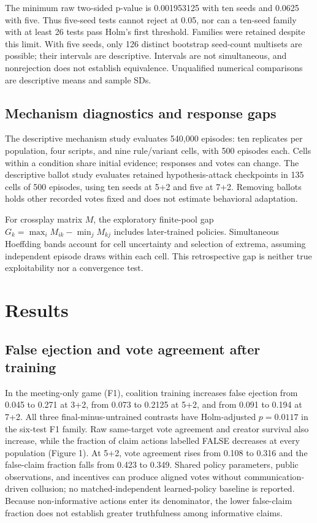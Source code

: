 \documentclass[
  12pt,
]{article}
\begin{document}
The minimum raw two-sided p-value is 0.001953125 with ten seeds and
0.0625 with five. Thus five-seed tests cannot reject at 0.05, nor can a
ten-seed family with at least 26 tests pass Holm's first threshold.
Families were retained despite this limit. With five seeds, only 126
distinct bootstrap seed-count multisets are possible; their intervals
are descriptive. Intervals are not simultaneous, and nonrejection does
not establish equivalence. Unqualified numerical comparisons are
descriptive means and sample SDs.

\FloatBarrier

\subsection{Mechanism diagnostics and response
gaps}\label{mechanism-diagnostics-and-response-gaps}

The descriptive mechanism study evaluates 540,000 episodes: ten
replicates per population, four scripts, and nine rule/variant cells,
with 500 episodes each. Cells within a condition share initial evidence;
responses and votes can change. The descriptive ballot study evaluates
retained hypothesis-attack checkpoints in 135 cells of 500 episodes,
using ten seeds at 5+2 and five at 7+2. Removing ballots holds other
recorded votes fixed and does not estimate behavioral adaptation.

For crossplay matrix \(M\), the exploratory finite-pool gap
\(G_k=\max_iM_{ik}-\min_jM_{kj}\) includes later-trained policies.
Simultaneous Hoeffding bands account for cell uncertainty and selection
of extrema, assuming independent episode draws within each cell. This
retrospective gap is neither true exploitability nor a convergence test.

\FloatBarrier

\section{Results}\label{results}

\FloatBarrier

\subsection{False ejection and vote agreement after
training}\label{false-ejection-and-vote-agreement-after-training}

In the meeting-only game (F1), coalition training increases false
ejection from 0.045 to 0.271 at 3+2, from 0.073 to 0.2125 at 5+2, and
from 0.091 to 0.194 at 7+2. All three final-minus-untrained contrasts
have Holm-adjusted \(p=0.0117\) in the six-test F1 family. Raw
same-target vote agreement and creator survival also increase, while the
fraction of claim actions labelled FALSE decreases at every population
(Figure 1). At 5+2, vote agreement rises from 0.108 to 0.316 and the
false-claim fraction falls from 0.423 to 0.349. Shared policy
parameters, public observations, and incentives can produce aligned
votes without communication-driven collusion; no matched-independent
learned-policy baseline is reported. Because non-informative actions
enter its denominator, the lower false-claim fraction does not establish
greater truthfulness among informative claims.
\end{document}

